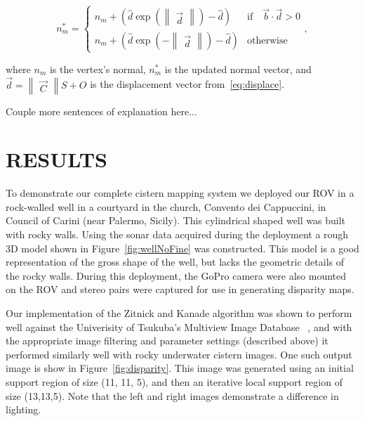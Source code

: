 \documentclass[a4paper,twoside]{article}
\begin{document}
\begin{equation}
   n_m^* = \left \{ \begin{array}{ll}
      n_m + \left(\hat{d} \exp\left(\begin{Vmatrix}\vec{d}\end{Vmatrix}\right) - \hat{d}\right) & \text{if} \quad \vec{b} \cdot \vec{d} > 0 \\
      n_m + \left(\hat{d} \exp\left(-\begin{Vmatrix}\vec{d}\end{Vmatrix}\right) -   \hat{d}\right) & \text{otherwise}
   \end{array},\right.
\label{eq:lighting}
\end{equation}


where $n_m$ is the vertex's normal, $n_m^*$ is the updated normal vector, and $\vec{d} = \begin{Vmatrix}\vec{C}\end{Vmatrix} S + O$ is the displacement vector from~\eqref{eq:displace}.

Couple more sentences of explanation here...

\section{\uppercase{Results}}
\label{sec:results}

To demonstrate our complete cistern mapping system we deployed our ROV in a rock-walled well in a courtyard in the church, Convento dei Cappuccini, in Council of Carini (near Palermo, Sicily).
This cylindrical shaped well was built with rocky walls.  Using the sonar data acquired during the deployment a rough 3D model shown in Figure~\ref{fig:wellNoFine} was constructed.  This model is a good representation of the gross shape of the well, but lacks the geometric details of the rocky walls.  During this deployment, the GoPro camera were also mounted on the ROV and stereo pairs were captured for use in generating disparity maps.

Our implementation of the Zitnick and Kanade algorithm was shown to perform well against the Univerisity of Tsukuba's Multiview Image Database ~\cite{stereo:zitKan}, and with the appropriate image filtering and parameter settings (described above) it performed similarly well with rocky underwater cistern images.
One such output image is show in Figure~\ref{fig:disparity}.
This image was generated using an initial support region of size (11, 11, 5), and then an iterative local support region of size (13,13,5).
Note that the left and right images demonstrate a difference in lighting.
\end{document}
